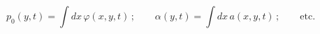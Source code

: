 \begin{equation}
p_0(y,t) = \int dx\, \varphi(x,y,t) \, ; \qquad
\alpha(y,t) = \int dx\, a(x,y,t) \, ; \qquad
\mathrm{etc.}
\label{eq11}
\end{equation}

